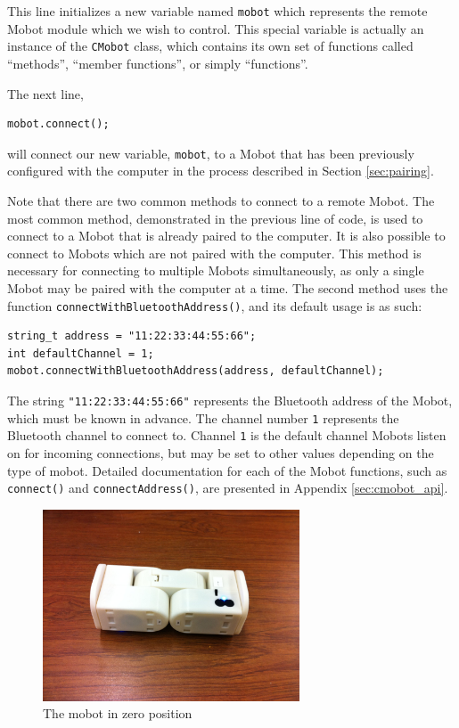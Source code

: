 \documentclass{article}
\begin{document}
This line
initializes a new variable named \texttt{mobot} which represents the remote
Mobot module which we wish to control. This special variable is actually an
instance of the \texttt{CMobot} class, which contains its own set of
functions called ``methods'', ``member functions'', or simply ``functions''.

The next line,
\begin{verbatim}
mobot.connect();
\end{verbatim}
will connect our new variable, \texttt{mobot}, to a
Mobot that has been previously configured with the computer in the 
process described in Section \ref{sec:pairing}.

Note that there are two common methods to connect to a remote Mobot. 
The most common method, demonstrated in the previous line of code, is
used to connect to a Mobot that is already paired to the computer. It
is also possible to connect to Mobots which are not paired with the 
computer. This method is necessary for connecting to multiple
Mobots simultaneously, as only a single Mobot may be paired with the
computer at a time. The second method uses the function
\texttt{connectWithBluetoothAddress()}, and its default usage is as such:
\begin{verbatim}
string_t address = "11:22:33:44:55:66";
int defaultChannel = 1;
mobot.connectWithBluetoothAddress(address, defaultChannel);
\end{verbatim}
The string \texttt{"11:22:33:44:55:66"} represents the Bluetooth address
of the Mobot, which must be known in advance. The channel number \texttt{1} 
represents the Bluetooth channel to connect to. Channel \texttt{1}
is the default channel Mobots listen on for incoming connections, but
may be set to other values depending on the type of mobot. Detailed
documentation for each of the Mobot functions, such as 
\texttt{connect()} and \texttt{connectAddress()}, are presented in
Appendix \ref{sec:cmobot_api}.

\begin{figure}
  \centering
  \includegraphics[width=3in]{images/inchworm1.jpg}
  \caption{The mobot in zero position}
  \label{fig:zeroposition}
\end{figure}
\end{document}
